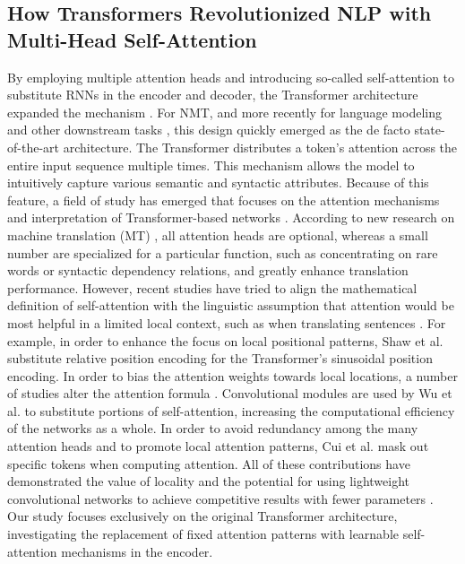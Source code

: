 \subsection{How Transformers Revolutionized NLP with Multi-Head Self-Attention} 
By employing multiple attention heads and introducing so-called self-attention to substitute RNNs in the encoder and decoder, the Transformer architecture expanded the mechanism \cite{Vaswani2017}. For NMT, and more recently for language modeling \cite{Radford2018} and other downstream tasks \cite{Strubell2018}, this design quickly emerged as the de facto state-of-the-art architecture. The Transformer distributes a token's attention across the entire input sequence multiple times. This mechanism allows the model to intuitively capture various semantic and syntactic attributes. Because of this feature, a field of study has emerged that focuses on the attention mechanisms and interpretation of Transformer-based networks \cite{Raganato2018} . According to new research on machine translation (MT) \cite{Voita2019b}, all attention heads are optional, whereas a small number are specialized for a particular function, such as concentrating on rare words or syntactic dependency relations, and greatly enhance translation performance. However, recent studies have tried to align the mathematical definition of self-attention with the linguistic assumption that attention would be most helpful in a limited local context, such as when translating sentences \cite{Hao2019a}. For example, in order to enhance the focus on local positional patterns, Shaw et al. \cite{Shaw2018} substitute relative position encoding for the Transformer's sinusoidal position encoding. In order to bias the attention weights towards local locations, a number of studies alter the attention formula \cite{Yang2018}. Convolutional modules are used by Wu et al. \cite{Wu2019} to substitute portions of self-attention, increasing the computational efficiency of the networks as a whole. In order to avoid redundancy among the many attention heads and to promote local attention patterns, Cui et al. \cite{Cui2019} mask out specific tokens when computing attention. All of these contributions have demonstrated the value of locality and the potential for using lightweight convolutional networks to achieve competitive results with fewer parameters \cite{Wu2019}. Our study focuses exclusively on the original Transformer architecture, investigating the replacement of fixed attention patterns with learnable self-attention mechanisms in the encoder.

